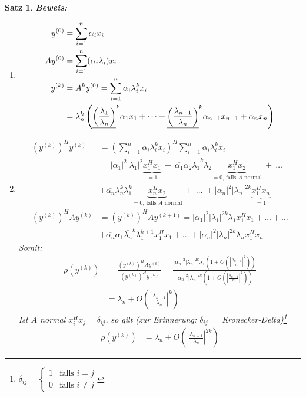 \documentclass[%
a4paper,
11pt,		%
]
{scrartcl}
\theoremstyle{plain}
\theoremstyle{plain}
\newtheorem{mysatz}[mydef]{Satz}
\theoremstyle{plain}
\theoremstyle{plain}
\begin{document}
\begin{mysatz}
\textbf{Beweis:}
\begin{enumerate}
\item 
\begin{align*}
y^{(0)} & = \sum\limits_{i=1}^n \alpha_i x_i\\
Ay^{(0)} & = \sum\limits_{i=1}^n (\alpha_i \lambda_i) x_i\\
y^{(k)} & = A^k y^{(0)} = \sum\limits_{i=1}^n \alpha_i \lambda_i^k x_i\\
& = \lambda_n^k \left( \uline{\left( \frac{\lambda_1}{\lambda_n} \right)}^k \alpha_1 x_1 + \dots +  \uline{\left( \frac{\lambda_{n-1}}{\lambda_n} \right)}^k \alpha_{n-1} x_{n-1} + \alpha_n x_n \right)
\end{align*}
\item
\begin{align*}
  \left( y^{(k)} \right)^H y^{(k)} & = \left( \sum\limits_{i=1}^n \alpha_i \lambda_i^k x_i \right)^H \sum\limits_{i=1}^n \alpha_i \lambda_i^k x_i\\
  & = |\alpha_1|^2 |\lambda_1|^2 \underbrace{x_1^H x_1}_{=1} \ + \ \overline{\alpha_1} \alpha_2 \overline{\lambda_1}^k \lambda_2 \underbrace{x_1^H x_2}_{=0\text{, falls $A$ normal}} \ + \ \ldots\\
  & + \overline{\alpha_n} \lambda_n^k \lambda_1^k \underbrace{x_n^H x_2}_{=0\text{, falls $A$ normal}} \ + \ \ldots \ + |\alpha_n|^2 |\lambda_n|^{2k} \underbrace{x_1^Hx_n}_{=1}\\
  \left( y^{(k)} \right)^H A y^{(k)} & = \left( y^{(k)} \right)^H A y^{(k+1)} = |\alpha_1|^2 |\lambda_1|^{2k} \lambda_1 x_1^H x_1 + \ldots + \ldots \\
   & + \overline{\alpha_n} \alpha_1 \overline{\lambda_n}^k \lambda_1^{k+1} x_1^H x_1 + \ldots + |\alpha_n|^2 |\lambda_n|^{2k} \lambda_n x_1^H x_n
\end{align*}
Somit:
\begin{align*}
\rho\left( y^{(k)} \right) & = \frac{\left( y^{(k)} \right)^H Ay^{(k)}}{\left( y^{(k)} \right)^H y^{(k)}} 
    = \frac{|\alpha_n|^2|\lambda_n|^{2k} \lambda_1 \left( 1 + O \left( \left| \frac{\lambda_{n-1}}{n} \right|^k \right) \right)}{|\alpha_n|^2|\lambda_n|^{2k} \left( 1 + O \left( \left| \frac{\lambda_{n-1}}{n} \right|^k \right) \right)}\\
    & = \lambda_n + O\left( \left| \frac{\lambda_{n-1}}{\lambda_n} \right|^k \right)
\end{align*}
Ist $A$ normal $x_i^H x_j = \delta_{ij}$, so gilt \hfill (zur Erinnerung: $\delta_{ij} = $ \textit{Kronecker-Delta})\footnote{$\delta_{ij} = \left\{\begin{matrix} 1 & \mbox{falls } i=j \\ 0 & \mbox{falls } i \neq j \end{matrix}\right.$}
\begin{align*}
  \rho\left( y^{(k)} \right) & = \lambda_n + O \left( \left| \frac{\lambda_{n-1}}{\lambda_n} \right|^{2k} \right)
\end{align*}
\end{enumerate}
\end{mysatz}
\end{document}
